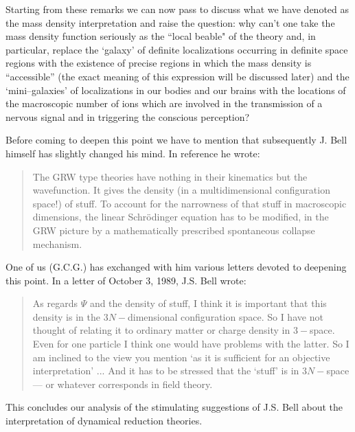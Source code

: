\documentclass[12pt]{article}
\begin{document}
Starting from
these remarks we can now pass to discuss what we have denoted as
the mass density interpretation and raise the question: why can't
one take the mass density function seriously as the ``local beable" of
the theory and, in particular, replace the `galaxy' of definite
localizations occurring in definite space regions with the existence of
precise regions in which the mass density is ``accessible'' (the exact
meaning of this expression will be discussed later)  and the
`mini--galaxies' of localizations in our bodies and our brains with the
locations of the macroscopic number of ions which are involved in the
transmission of a  nervous signal and in triggering the conscious
perception?

Before coming to deepen this point we have to mention that subsequently
J. Bell himself has slightly changed his mind. In reference \cite{bellam}
he wrote:
\begin{quotation}
The GRW type theories have nothing in their kinematics but the
wavefunction. It gives the density (in a multidimensional
configuration space!) of stuff. To account for the narrowness of
that stuff in macroscopic dimensions, the linear Schr\"{o}dinger
equation has to be modified, in the GRW picture by a
mathematically prescribed spontaneous collapse mechanism.
\end{quotation}
One of us (G.C.G.) has exchanged with him various letters devoted to
deepening this point. In a letter of October 3, 1989, J.S. Bell
wrote:
\begin{quotation}
As regards $\Psi $ and the density of stuff, I think it is
important that this density is in the $3N-$dimensional
configuration space. So I have not thought of relating it to
ordinary matter or charge density in $3-$space. Even for one
particle I think one would have problems with the latter. So I am
inclined to the view you mention `as it is sufficient for an
objective interpretation' ... And it has to be stressed that the
`stuff' is in $3N-$space --- or whatever corresponds in field
theory.
\end{quotation}

This concludes our analysis of the stimulating suggestions of J.S.
Bell about the interpretation of dynamical reduction theories.
\end{document}
